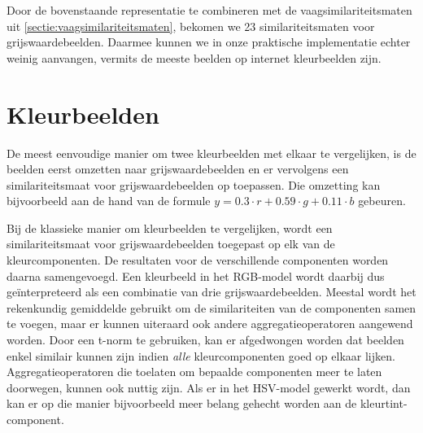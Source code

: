 
Door de bovenstaande representatie te combineren met de vaagsimilariteitsmaten uit 
\ref{sectie:vaagsimilariteitsmaten}, bekomen we 23 similariteitsmaten voor grijswaardebeelden.
Daarmee kunnen we in onze praktische implementatie echter weinig aanvangen, vermits de
meeste beelden op internet kleurbeelden zijn. 


\section{Kleurbeelden}
\label{sectie:pixelgeb_kleurbeelden}
\label{sectie:kleurbeelden_similariteitsmaten}

De meest eenvoudige manier om twee kleurbeelden met elkaar te vergelijken, is de beelden eerst omzetten naar 
grijswaardebeelden en er vervolgens een similariteitsmaat voor grijswaardebeelden op toepassen. Die omzetting 
kan bijvoorbeeld aan de hand van de formule $y = 0.3 \cdot r + 0.59 \cdot g + 0.11 \cdot b$ 
\cite{debaets:similariteitsmaten_voor_kleurbeelden} gebeuren.

Bij de klassieke manier om kleurbeelden te vergelijken, wordt een similariteitsmaat 
voor grijswaardebeelden toegepast op elk van de kleurcomponenten. De resultaten voor de
verschillende componenten worden daarna samengevoegd. Een kleurbeeld in het RGB-model wordt daarbij
dus ge\"interpreteerd als een combinatie van drie grijswaardebeelden. Meestal wordt
het rekenkundig gemiddelde gebruikt om de similariteiten van de componenten samen te voegen,
maar er kunnen uiteraard ook andere aggregatieoperatoren aangewend worden. Door een t-norm
te gebruiken, kan er afgedwongen worden dat beelden enkel similair kunnen
zijn indien \emph{alle} kleurcomponenten goed op elkaar lijken. Aggregatieoperatoren
die toelaten om bepaalde componenten meer te laten doorwegen, kunnen ook nuttig
zijn. Als er in het HSV-model gewerkt wordt, dan kan er op die manier 
bijvoorbeeld meer belang gehecht worden aan de kleurtint-component.

